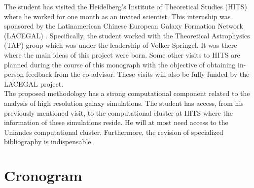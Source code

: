 \documentclass[12pt]{article}
\begin{document}
The student has visited  the Heidelberg's Institute of Theoretical Studies (HITS) where he worked for one month as an invited scientist.
This internship was sponsored by the Latinamerican Chinese European Galaxy Formation Network (LACEGAL) \cite{LACEGAL}. 
Specifically, the student worked with the Theoretical Astrophysics (TAP) group which was under the leadership of Volker Springel. 
It was there where the main ideas of this project were born.
 Some other visits to HITS are planned during the course of this monograph with the objective of obtaining in-person feedback from the co-advisor. 
These visits will also be fully funded by the LACEGAL project.\\

The proposed methodology has a strong computational component related to the analysis of high resolution galaxy simulations. 
The student has access, from his previously mentioned visit, to the computational cluster at HITS where the information of these simulations reside.
He will at most need access to the Uniandes computational cluster.
Furthermore, the revision of specialized bibliography is indispensable.\\


\section{Cronogram}
\end{document}
